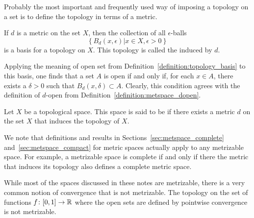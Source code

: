 
Probably the most important and frequently used way of imposing a topology on a set is to define the topology in terms of a metric.
\begin{example}
If $d$ is a metric on the set $X$, then the collection of all $\epsilon$-balls
\begin{equation*}
\left\{ B_d (x, \epsilon) |  x \in X, \epsilon > 0 \right\}
\end{equation*}
is a basis for a topology on $X$.
This topology is called the  induced by $d$.

Applying the meaning of open set from Definition~\ref{definition:topology_basis} to this basis, one finds that a set $A$ is open if and only if, for each $x \in A$, there exists a $\delta > 0$ such that $B_d (x, \delta) \subset A$.
Clearly, this condition agrees with the definition of $d$-open from Definition~\ref{definition:metspace_dopen}.
\end{example}

\begin{definition}
Let $X$ be a topological space.
This space is said to be  if there exists a metric $d$ on the set $X$ that induces the topology of $X$.
\end{definition}

We note that definitions and results in Sections~\ref{sec:metspace_complete} and~\ref{sec:metspace_compact} for metric spaces actually apply to any metrizable space.
For example, a metrizable space is complete if and only if there the metric that induces its topology also defines a complete metric space.

\begin{example}
While most of the spaces discussed in these notes are metrizable, there is a very common notion of convergence that is not metrizable.
The topology on the set of functions $f \colon [0,1]\rightarrow \mathbb{R}$ where the open sets are defined by pointwise convergence is not metrizable.
\end{example}



